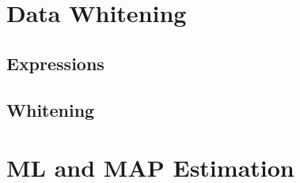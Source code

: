 \documentclass{article}
\begin{document}
\section{Data Whitening}

\subsection{Expressions}
\subsection{Whitening}

\newpage
\section{ML and MAP Estimation}

\subsection{}
\subsection{}
\subsection{}
\end{document}
